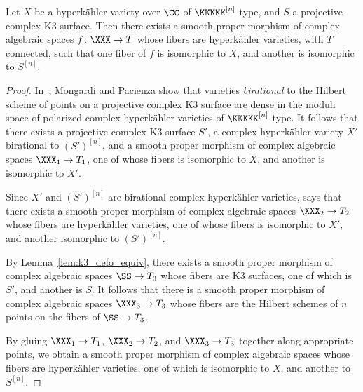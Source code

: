 \begin{lemma}\label{lem:riess}
Let $X$ be a hyperk\"ahler variety over $\CC$ of $\KKKKK^{[n]}$ type, and $S$ a projective complex K3 surface. Then there exists a smooth proper morphism of complex algebraic spaces $f\colon \XXX \rightarrow T$ whose fibers are hyperk\"ahler varieties, with $T$ connected, such that one fiber of $f$ is isomorphic to $X$, and another is isomorphic to $S^{[n]}$.
\end{lemma}
\begin{proof}
In~\cite[Corollary~1.2]{MongardiPacienza}, Mongardi and Pacienza show that varieties \emph{birational} to the Hilbert scheme of points on a projective complex K3 surface are dense in the moduli space of polarized complex hyperk\"ahler varieties of $\KKKKK^{[n]}$ type. It follows that there exists a projective complex K3 surface $S'$, a complex hyperk\"ahler variety $X'$ birational to $(S')^{[n]}$, and a smooth proper morphism of complex algebraic spaces $\XXX_1 \rightarrow T_1$, one of whose fibers is isomorphic to $X$, and another is isomorphic to $X'$.

Since $X'$ and $(S')^{[n]}$ are birational complex hyperk\"ahler varieties, \cite[Proposition~2.1]{Riess} says that there exists a smooth proper morphism of complex algebraic spaces $\XXX_2 \rightarrow T_2$ whose fibers are hyperk\"ahler varieties, one of whose fibers is isomorphic to $X'$, and another isomorphic to $(S')^{[n]}$.

By Lemma~\ref{lem:k3_defo_equiv}, there exists a smooth proper morphism of complex algebraic spaces $\SS \rightarrow T_3$ whose fibers are K3 surfaces, one of which is $S'$, and another is $S$. It follows that there is a smooth proper morphism of complex algebraic spaces $\XXX_3 \rightarrow T_3$ whose fibers are the Hilbert schemes of $n$ points on the fibers of $\SS \rightarrow T_3$.

By gluing $\XXX_1 \rightarrow T_1$, $\XXX_2 \rightarrow T_2$, and $\XXX_3 \rightarrow T_3$ together along appropriate points, we obtain a smooth proper morphism of complex algebraic spaces whose fibers are hyperk\"ahler varieties, one of which is isomorphic to $X$, and another to $S^{[n]}$.
\end{proof}

